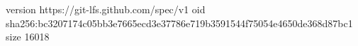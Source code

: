 version https://git-lfs.github.com/spec/v1
oid sha256:bc3207174c05bb3e7665ecd3e37786e719b3591544f75054e4650de368d87bc1
size 16018
